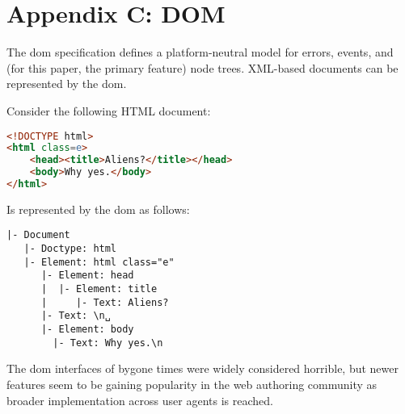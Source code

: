 
\chapter{Appendix C: DOM}\label{appendix-c-dom}

The \gls{dom} specification defines a platform-neutral model for errors,
events, and (for this paper, the primary feature) node trees. XML-based
documents can be represented by the \gls{dom}.

Consider the following HTML document:

\begin{lstlisting}[language=HTML]
<!DOCTYPE html>
<html class=e>
    <head><title>Aliens?</title></head>
    <body>Why yes.</body>
</html>
\end{lstlisting}

Is represented by the \gls{dom} as follows:

\begin{lstlisting}
|- Document
   |- Doctype: html
   |- Element: html class="e"
      |- Element: head
      |  |- Element: title
      |     |- Text: Aliens?
      |- Text: \n␣
      |- Element: body
        |- Text: Why yes.\n
\end{lstlisting}

The \gls{dom} interfaces of bygone times were widely considered horrible,
but newer features seem to be gaining popularity in the web authoring
community as broader implementation across user agents is reached.
